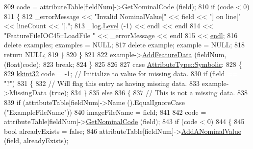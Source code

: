 \begin{DoxyCode}
809           code = attributeTable[fieldNum]->\hyperlink{class_k_k_m_l_l_1_1_attribute_adc5bad6931d6c3f4aea6e1ad5c42b1f1}{GetNominalCode} (field);
810           \textcolor{keywordflow}{if}  (code < 0)
811           \{
812             \_errorMessage << \textcolor{stringliteral}{"Invalid NominalValue["} << field << \textcolor{stringliteral}{"]  on line["} << lineCount << \textcolor{stringliteral}{"]."};
813             \_log.\hyperlink{class_k_k_b_1_1_run_log_a32cf761d7f2e747465fd80533fdbb659}{Level} (-1) << endl << endl
814                             << \textcolor{stringliteral}{"FeatureFileIOC45::LoadFile    "} << \_errorMessage << endl
815                             << \hyperlink{namespace_k_k_b_ad1f50f65af6adc8fa9e6f62d007818a8}{endl};
816             \textcolor{keyword}{delete}  examples;  examples = NULL;
817             \textcolor{keyword}{delete}  example;   example  = NULL;
818             \textcolor{keywordflow}{return} NULL;
819           \}
820         \}
821 
822         example->\hyperlink{class_k_k_m_l_l_1_1_feature_vector_abf364e3348c041cd7be6f14d6c4567cf}{AddFeatureData} (fieldNum, (\textcolor{keywordtype}{float})code);
823         \textcolor{keywordflow}{break};
824       \}
825         
826 
827       \textcolor{keywordflow}{case} \hyperlink{namespace_k_k_m_l_l_a99973706982b59debba670e2480555abaaddee1396a3e20ceea8071ed6da54866}{AttributeType::Symbolic}: 
828       \{
829         \hyperlink{namespace_k_k_b_a8fa4952cc84fda1de4bec1fbdd8d5b1b}{kkint32}  code = -1;  \textcolor{comment}{// Initialize to value for missing data.}
830         \textcolor{keywordflow}{if}  (field == \textcolor{stringliteral}{"?"})
831         \{
832           \textcolor{comment}{// Will flag this entry as having missing data.}
833           example->\hyperlink{class_k_k_m_l_l_1_1_feature_vector_a6576552806c4833d80013d8e759f76bf}{MissingData} (\textcolor{keyword}{true});
834         \}
835         \textcolor{keywordflow}{else}
836         \{
837           \textcolor{comment}{// This is not a missing data.}
838 
839           \textcolor{keywordflow}{if}  (attributeTable[fieldNum]->Name ().EqualIgnoreCase (\textcolor{stringliteral}{"ExampleFileName"}))
840             imageFileName = field;
841 
842           code = attributeTable[fieldNum]->\hyperlink{class_k_k_m_l_l_1_1_attribute_adc5bad6931d6c3f4aea6e1ad5c42b1f1}{GetNominalCode} (field);
843           \textcolor{keywordflow}{if}  (code < 0)
844           \{
845             \textcolor{keywordtype}{bool}  alreadyExists = \textcolor{keyword}{false};
846             attributeTable[fieldNum]->\hyperlink{class_k_k_m_l_l_1_1_attribute_aca915581709a40bd7021a482d566fa48}{AddANominalValue} (field, alreadyExists);

\end{DoxyCode}
